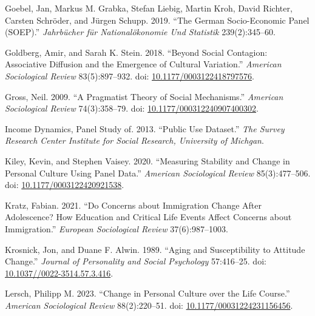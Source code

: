\documentclass[
  12pt,
]{article}
\newlength{\cslhangindent}
\newlength{\cslentryspacingunit} %
\newenvironment{CSLReferences}[2] %
 {%
  \setlength{\parindent}{0pt}
  \ifodd #1
  \let\oldpar\par
  \def\par{\hangindent=\cslhangindent\oldpar}
  \fi
  \setlength{\parskip}{#2\cslentryspacingunit}
 }%
 {}
\begin{document}
\begin{CSLReferences}{1}{0}
\leavevmode{}%
Goebel, Jan, Markus M. Grabka, Stefan Liebig, Martin Kroh, David
Richter, Carsten Schröder, and Jürgen Schupp. 2019. {``The German
Socio-Economic Panel (SOEP).''} \emph{Jahrb{ü}cher f{ü}r
National{ö}konomie Und Statistik} 239(2):345--60.

\leavevmode{}%
Goldberg, Amir, and Sarah K. Stein. 2018. {``Beyond {Social}
{Contagion}: {Associative} {Diffusion} and the {Emergence} of {Cultural}
{Variation}.''} \emph{American Sociological Review} 83(5):897--932. doi:
\href{https://doi.org/10.1177/0003122418797576}{10.1177/0003122418797576}.

\leavevmode{}%
Gross, Neil. 2009. {``A {Pragmatist} {Theory} of {Social}
{Mechanisms}.''} \emph{American Sociological Review} 74(3):358--79. doi:
\href{https://doi.org/10.1177/000312240907400302}{10.1177/000312240907400302}.

\leavevmode{}%
Income Dynamics, Panel Study of. 2013. {``Public Use Dataset.''}
\emph{The Survey Research Center Institute for Social Research,
University of Michgan}.

\leavevmode{}%
Kiley, Kevin, and Stephen Vaisey. 2020. {``Measuring {Stability} and
{Change} in {Personal} {Culture} {Using} {Panel} {Data}.''}
\emph{American Sociological Review} 85(3):477--506. doi:
\href{https://doi.org/10.1177/0003122420921538}{10.1177/0003122420921538}.

\leavevmode{}%
Kratz, Fabian. 2021. {``Do Concerns about Immigration Change After
Adolescence? How Education and Critical Life Events Affect Concerns
about Immigration.''} \emph{European Sociological Review}
37(6):987--1003.

\leavevmode{}%
Krosnick, Jon, and Duane F. Alwin. 1989. {``Aging and {Susceptibility}
to {Attitude} {Change}.''} \emph{Journal of Personality and Social
Psychology} 57:416--25. doi:
\href{https://doi.org/10.1037//0022-3514.57.3.416}{10.1037//0022-3514.57.3.416}.

\leavevmode{}%
Lersch, Philipp M. 2023. {``Change in {Personal} {Culture} over the
{Life} {Course}.''} \emph{American Sociological Review} 88(2):220--51.
doi:
\href{https://doi.org/10.1177/00031224231156456}{10.1177/00031224231156456}.


\end{CSLReferences}
\end{document}
